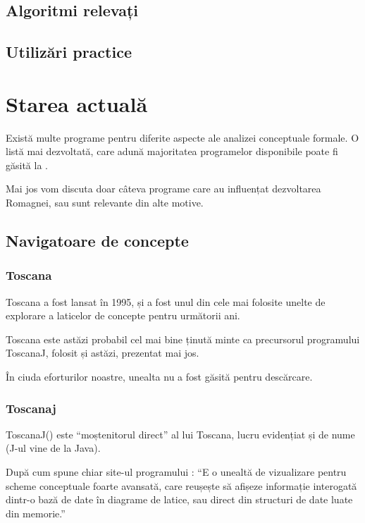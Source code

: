 \documentclass[12pt, a4paper, twoside, romanian]{teza-upb}
\begin{document}
  \section{Algoritmi relevați}

  \section{Utilizări practice}
  \label{sec:utilizari-practice}

\chapter{Starea actuală}

  Există multe programe pentru diferite aspecte ale analizei conceptuale formale. O listă mai dezvoltată, care adună majoritatea programelor disponibile poate fi găsită la \cite{utapriss:software}.

  Mai jos vom discuta doar câteva programe care au influențat dezvoltarea Romagnei, sau sunt relevante din alte motive.
  \section{Navigatoare de concepte}
    \subsection{Toscana}
      Toscana\cite{Vogt:1995:Toscana} a fost lansat în 1995, și a fost unul din cele mai folosite unelte de explorare a laticelor de concepte pentru următorii ani.

      Toscana este astăzi probabil cel mai bine ținută minte ca precursorul programului ToscanaJ, folosit și astăzi, prezentat mai jos.

      În ciuda eforturilor noastre, unealta nu a fost găsită pentru descărcare.

    \subsection{Toscanaj}
      ToscanaJ(\cite{Toscanaj:homepage}) este ``moștenitorul direct'' al lui Toscana, lucru evidențiat și de nume (J-ul vine de la Java).

      După cum spune chiar site-ul programului \cite{Toscanaj:toscanaj}: ``E o unealtă de vizualizare pentru scheme conceptuale foarte avansată, care reușește să afișeze informație interogată dintr-o bază de date în diagrame de latice, sau direct din structuri de date luate din memorie.''
\end{document}
